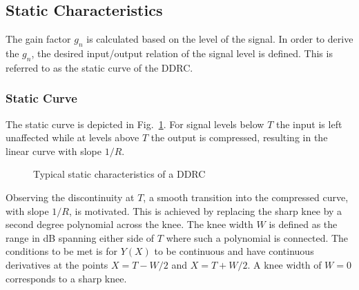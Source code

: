 \documentclass[../main2.tex]{subfiles}
\providecommand{\rootdir}{..}
\begin{document}
\FloatBarrier
\subsection{Static Characteristics}
The gain factor $g_n$ is calculated based on the level of the signal. In order to derive the $g_n$, the desired input/output relation of the signal level is defined. This is referred to as the static curve of the DDRC.
\subsubsection{Static Curve}
The static curve is depicted in Fig.~\ref{fig:typical_static_detailed}. For signal levels below $T$ the input is left unaffected while at levels above $T$ the output is compressed, resulting in the linear curve with slope $1/R$.  

\begin{figure}
\centerline{}
\caption{Typical static characteristics of a DDRC}
\label{fig:typical_static_detailed}
\end{figure}

Observing the discontinuity at $T$, a smooth transition into the compressed curve, with slope $1/R$, is motivated. This is achieved by replacing the sharp knee by a second degree polynomial\cite{frindle1996implementation}\cite{reiss2012tutorial} across the knee. The knee width $W$ is defined as the range in dB spanning either side of $T$ where such a polynomial is connected. The conditions to be met is for $Y(X)$ to be continuous and have continuous derivatives at the points $X=T-W/2$ and $X=T+W/2$. A knee width of $W=0$ corresponds to a sharp knee. 
\end{document}
